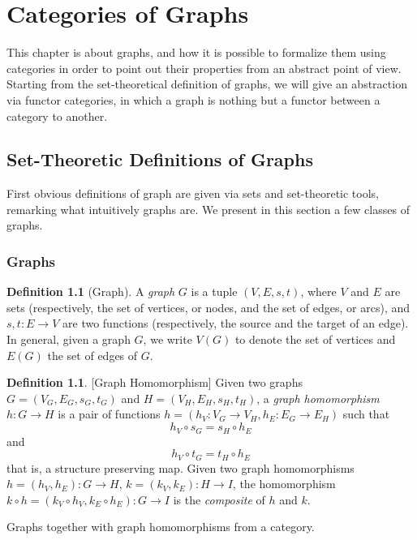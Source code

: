 \documentclass[a4paper, twoside,openright]{report}
\theoremstyle{plain}
\theoremstyle{definition}
\newtheorem{definition}[theorem]{Definition}
\begin{document}
\chapter{Categories of Graphs}
This chapter is about graphs, and how it is possible to formalize them using categories in order to point out their properties from an abstract point of view. Starting from the set-theoretical definition of graphs, we will give an abstraction via functor categories, in which a graph is nothing but a functor between a category to another.

\section{Set-Theoretic Definitions of Graphs}

First obvious definitions of graph are given via sets and set-theoretic tools, remarking what intuitively graphs are. We present in this section a few classes of graphs.

\subsection{Graphs}

\begin{definition}[Graph]
    A \emph{graph} $G$ is a tuple $(V, E, s, t)$, where $V$ and $E$ are sets (respectively, the set of vertices, or nodes, and the set of edges, or arcs), and $s, t: E \rightarrow V$ are two functions (respectively, the source and the target of an edge).
    In general, given a graph $G$, we write $V(G)$ to denote the set of vertices and $E(G)$ the set of edges of $G$.
\end{definition}

\begin{definition}\label{def:graph_hom}[Graph Homomorphism]
    Given two graphs $G=(V_G, E_G, s_G, t_G)$ and $H=(V_H, E_H, s_H, t_H)$, a \emph{graph homomorphism} $h: G \rightarrow H$ is a pair of functions $h = (h_V: V_G \rightarrow V_H, h_E: E_G \rightarrow E_H)$ such that
    \[
        h_V \circ s_G = s_H \circ h_E
    \]
    and
    \[
        h_V \circ t_G = t_H \circ h_E
    \]
    that is, a structure preserving map.
    Given two graph homomorphisms $h = (h_V, h_E): G \rightarrow H$, $k = (k_V, k_E): H \rightarrow I$, the homomorphism $ k \circ h = (k_V \circ h_V, k_E \circ h_E): G \rightarrow I$ is the \emph{composite} of $h$ and $k$.
\end{definition}

Graphs together with graph homomorphisms from a category.
\end{document}
